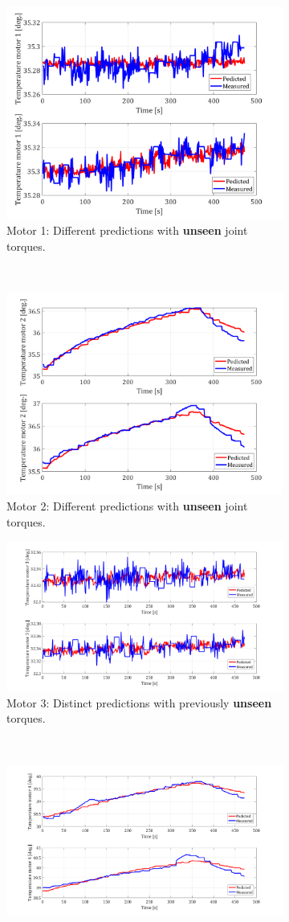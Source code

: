 \documentclass{ifacconf}
\begin{document}
\begin{figure}[t!]
	\centering
	\begin{subfigure}[t]{\columnwidth}
		\centering
		\includegraphics[height=2.in]{./pictures/applications/J1o.png}
		\caption{Motor 1: Different predictions with \textbf{unseen} joint torques.}
	\end{subfigure}%
	~ 
	\begin{subfigure}[t]{\columnwidth}
		\centering
		\includegraphics[height=2.in]{./pictures/applications/J2o.png}
		\caption{Motor 2: Different predictions with \textbf{unseen} joint torques.}
	\end{subfigure}
	\begin{subfigure}[t]{\columnwidth}
	\includegraphics[height=2.in]{./pictures/applications/J3o.png}
	\caption{Motor 3: Distinct predictions with previously \textbf{unseen}  torques.}
\end{subfigure}%
~ 
\begin{subfigure}[t]{\columnwidth}
	\includegraphics[height=2.in]{./pictures/applications/J4o.png}

\end{subfigure}
\end{figure}
\end{document}
